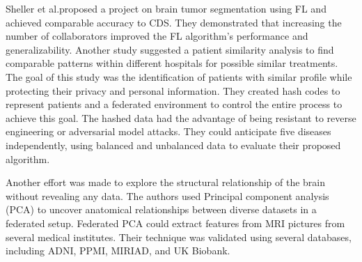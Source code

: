 Sheller et al.\cite{sheller2020federated}proposed a project on brain tumor segmentation using FL and achieved comparable accuracy to CDS. They demonstrated that increasing the number of collaborators improved the FL algorithm's performance and generalizability. Another study suggested a patient similarity analysis to find comparable patterns within different hospitals for possible similar treatments\cite{lee2018privacy}.
The goal of this study was the identification of patients with similar profile while protecting their privacy and personal information. They created hash codes to represent patients and a federated environment to control the entire process to achieve this goal. The hashed data had the advantage of being resistant to reverse engineering or adversarial model attacks. They could anticipate five diseases independently, using balanced and unbalanced data to evaluate their proposed algorithm. 

Another effort was made to explore the structural relationship of the brain without revealing any data. The authors used Principal component analysis (PCA) to uncover anatomical relationships between diverse datasets in a federated setup\cite{grammenos2019federated}. Federated PCA could extract features from MRI pictures from several medical institutes. Their technique was validated using several databases, including ADNI, PPMI, MIRIAD, and UK Biobank\cite{silva2019federated}.

